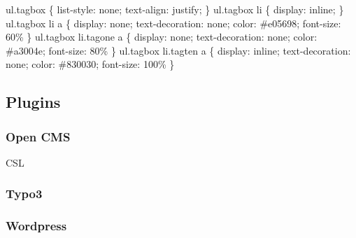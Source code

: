 \documentclass[a4paper,11pt,twoside]{scrbook}
\begin{document}
\begin{enumerate}
    ul.tagbox \{ list-style: none; text-align: justify; \}\newline
    ul.tagbox li \{ display: inline; \}\newline
    ul.tagbox li a \{ display: none; text-decoration: none; color: \#e05698; font-size: 60\% \} \newline
    ul.tagbox li.tagone a \{  display: none; text-decoration: none; color: \#a3004e; font-size: 80\% \} \newline
    ul.tagbox li.tagten a \{  display: inline; text-decoration: none; color: \#830030; font-size: 100\% \} \newline
\end{enumerate}

\subsection{Plugins} 
\subsubsection{Open CMS}CSL
\subsubsection{Typo3}
\subsubsection{Wordpress}
\newpage  

\renewcommand{\indexname}{Stichwortverzeichnis}
\printindex
\end{document}
